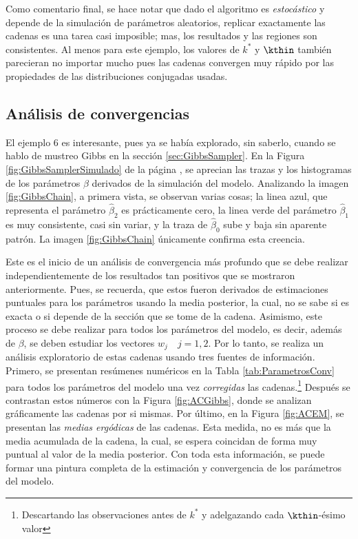 Como comentario final, se hace notar que dado el algoritmo es \textit{estocástico} y depende de la simulación de parámetros aleatorios, replicar exactamente las cadenas es una tarea casi imposible; mas, los resultados y las regiones son consistentes. Al menos para este ejemplo, los valores de $k^*$ y $\kthin$ también parecieran no importar mucho pues las cadenas convergen muy rápido por las propiedades de las distribuciones conjugadas usadas. 

\subsection{Análisis de convergencias} \label{sec:AnalisisConv}
El ejemplo 6 es interesante, pues ya se había explorado, sin saberlo, cuando se hablo de mustreo Gibbs en la sección \ref{sec:GibbsSampler}. En la Figura \ref{fig:GibbsSamplerSimulado} de la página \pageref{fig:GibbsSamplerSimulado}, se aprecian las trazas y los histogramas de los parámetros $\beta$ derivados de la simulación del modelo. Analizando la imagen \ref{fig:GibbsChain}, a primera vista, se observan varias cosas; la linea azul, que representa el parámetro $\hat{\beta}_2$ es prácticamente cero, la linea verde del parámetro $\hat{\beta}_1$ es muy consistente, casi sin variar, y la traza de $\hat{\beta}_0$ sube y baja sin aparente patrón. La imagen \ref{fig:GibbsChain} únicamente confirma esta creencia.

Este es el inicio de un análisis de convergencia más profundo que se debe realizar independientemente de los resultados tan positivos que se mostraron anteriormente. Pues, se recuerda, que estos fueron derivados de estimaciones puntuales para los parámetros usando la media posterior, la cual, no se sabe si es exacta o si depende de la sección que se tome de la cadena. Asimismo, este proceso se debe realizar para todos los parámetros del modelo, es decir, además de $\beta$, se deben estudiar los vectores $w_j \quad j = 1,2$. Por lo tanto, se realiza un análisis exploratorio de estas cadenas usando tres fuentes de información. Primero, se presentan resúmenes numéricos en la Tabla \ref{tab:ParametrosConv} para todos los parámetros del modelo una vez \textit{corregidas} las cadenas.\footnote{Descartando las observaciones antes de $k^*$ y adelgazando cada $\kthin$-ésimo valor} Después se contrastan estos números con la Figura \ref{fig:ACGibbs}, donde se  analizan gráficamente las cadenas por si mismas. Por último, en la Figura \ref{fig:ACEM}, se presentan las \textit{medias ergódicas} de las cadenas. Esta medida, no es más que la media acumulada de la cadena, la cual, se espera coincidan de forma muy puntual al valor de la media posterior. Con toda esta información, se puede formar una pintura completa de la estimación y convergencia de los parámetros del modelo.

